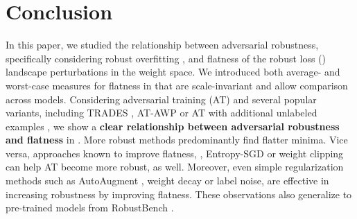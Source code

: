 \section{Conclusion}
\label{sec:conclusion}

In this paper, we studied the relationship between adversarial robustness, specifically considering robust overfitting \cite{RiceICML2020}, and flatness of the robust loss (\RCE) landscape \wrt perturbations in the weight space. We introduced both average- and worst-case measures for flatness in \RCE that are scale-invariant and allow comparison across models. Considering adversarial training (AT) and several popular variants, including TRADES \cite{ZhangICML2019}, AT-AWP \cite{WuNIPS2020} or AT with additional unlabeled examples \cite{CarmonNIPS2019}, we show a \textbf{clear relationship between adversarial robustness and flatness} in \RCE. More robust methods predominantly find flatter minima. Vice versa, approaches known to improve flatness, \eg, Entropy-SGD \cite{ChaudhariICLR2017} or weight clipping \cite{StutzMLSYS2021} can help AT become more robust, as well. Moreover, even simple regularization methods such as AutoAugment \cite{CubukARXIV2018}, weight decay or label noise, are effective in increasing robustness by improving flatness. These observations also generalize to pre-trained models from RobustBench \cite{CroceARXIV2020b}. 